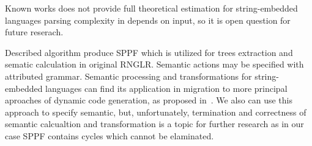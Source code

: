 Known works does not provide full theoretical estimation for string-embedded languages parsing complexity in depends on input, so it is open question for future reserach.

Described algorithm produce SPPF which is utilized for trees extraction and sematic calculation in original RNGLR. Semantic actions may be specified with attributed grammar.
Semantic processing and transformations for string-embedded languages can find its application in migration to more principal aproaches of dynamic code generation, as proposed in~\cite{EvalToStaged}.
We also can use this approach to specify semantic, but, unfortunately, termination and correctness of semantic calcualtion and transformation is a topic for further research 
as in our case SPPF contains cycles which cannot be elaminated. 

